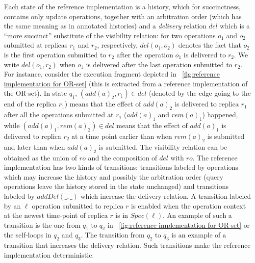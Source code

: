 Each state of the reference implementation is a history, which for succinctness, contains only update operations, together with an arbitration order (which has the same meaning as in annotated histories) and a \emph{delivery} relation $del$ which is a ``more succinct'' substitute of the visibility relation: for two operations $o_1$ and $o_2$ submitted at replicas $r_1$ and $r_2$, respectively, $del(o_1,o_2)$ denotes the fact that $o_2$ is the first operation submitted to $r_2$ after the operation $o_1$ is delivered to $r_2$. We write $del(o_1,r_2)$ when $o_1$ is delivered after the last operation submitted to $r_2$. For instance, consider the execution fragment depicted in \figurename~\ref{fig:reference implementation for OR-set} (this is extracted from a reference implementation of the OR-set). In state $q_1$, $(add(a)_2,r_1) \in \mathit{del}$ (denoted by the edge going to the end of the replica $r_1$) means that the effect of $add(a)_2$ is delivered to replica $r_1$ after all the operations submitted at $r_1$ ($add(a)_1$ and $rem(a)_1$) happened, while $(add(a)_1,rem(a)_2) \in \mathit{del}$ means that the effect of $add(a)_1$ is delivered to replica $r_2$ at a time point earlier than when $rem(a)_2$ is submitted and later than when $add(a)_2$ is submitted. The visibility relation can be obtained as the union of $\mathit{ro}$ and the composition of $\mathit{del}$ with $\mathit{ro}$. The reference implementation has two kinds of transitions: transitions labeled by operations which may increase the history and possibly the arbitration order (query operations leave the history stored in the state unchanged) and transitions labeled by $\mathit{addDel}(\_,\_)$ which increase the delivery relation. A transition labeled by an $\ell$ operation submitted to replica $r$ is enabled when the operation context at the newest time-point of replica $r$ is in $\mathit{Spec}(\ell)$. An example of such a transition is the one from $q_1$ to $q_2$ in \figurename~\ref{fig:reference implementation for OR-set} or the self-loops in $q_2$ and $q_3$. The transition from $q_2$ to $q_3$ is an example of a transition that increases the delivery relation. Such transitions make the reference implementation deterministic.

